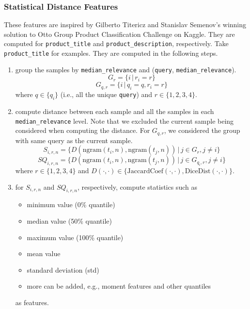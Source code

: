 \documentclass[12pt]{article}
\begin{document}
\subsubsection{Statistical Distance Features}
\label{subsubsec:Statistical_Distance_Features}
These features are inspired by Gilberto Titericz and Stanislav Semenov's winning solution \cite{Otto_1st} to Otto Group Product Classification Challenge on Kaggle. They are computed for \texttt{product\_title} and \texttt{product\_description}, respectively. Take \texttt{product\_title} for examples. They are computed in the following steps.
\begin{enumerate}
\item group the samples by \texttt{median\_relevance} and (\texttt{query}, \texttt{median\_relevance}).
\begin{equation}
G_r = \{i \,|\, r_i = r\}
\end{equation}
\begin{equation}
G_{q,r} = \{i \,|\, q_i = q, r_i = r\}
\end{equation}
where $q\in{\{q_i\}}$ (i.e., all the unique \texttt{query}) and $r\in{\{1,2,3,4\}}$.
\item compute distance between each sample and all the samples in each \texttt{median\_relevance} level. Note that we excluded the current sample being considered when computing the distance. For $G_{q,r}$, we considered the group with same query as the current sample.
\begin{equation}
S_{i,r,n} = \{D(\text{ngram}(t_i, n), \text{ngram}(t_j, n)) \,|\, j \in{G_r}, j \neq i \}
\end{equation}
\begin{equation}
SQ_{i,r,n} = \{D(\text{ngram}(t_i, n), \text{ngram}(t_j, n)) \,|\, j \in{G_{q_i,r}}, j \neq i \}
\end{equation}
where $r\in{\{1,2,3,4\}}$ and $D(\cdot, \cdot)\in\{\text{JaccardCoef}(\cdot, \cdot), \text{DiceDist}(\cdot, \cdot)\}$.
\item for $S_{i,r,n}$ and $SQ_{i,r,n}$, respectively, compute statistics such as
    \begin{itemize}
        \item minimum value (0\% quantile)
        \item median value (50\% quantile)
        \item maximum value (100\% quantile)
        \item mean value
        \item standard deviation (std)
        \item more can be added, e.g., moment features and other quantiles
    \end{itemize}
    as features.
\end{enumerate}
\end{document}
